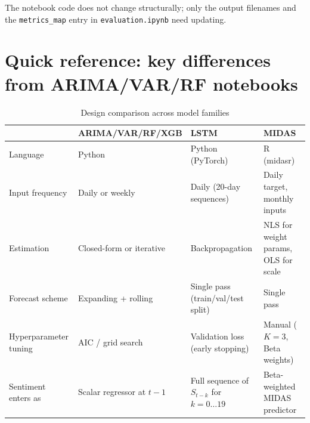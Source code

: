 \documentclass[12pt, a4paper]{article}
\begin{document}
The notebook code does not change structurally; only the output filenames and the
\texttt{metrics\_map} entry in \texttt{evaluation.ipynb} need updating.

\section{Quick reference: key differences from ARIMA/VAR/RF notebooks}

\begin{table}[H]
\centering
\caption{Design comparison across model families}
\begin{tabular}{p{3cm}p{3cm}p{3cm}p{3cm}}
\toprule
 & ARIMA/VAR/RF/XGB & LSTM & MIDAS \\
\midrule
Language & Python & Python (PyTorch) & R (midasr) \\
Input frequency & Daily or weekly & Daily (20-day sequences) & Daily target, monthly inputs \\
Estimation & Closed-form or iterative & Backpropagation & NLS for weight params, OLS for scale \\
Forecast scheme & Expanding + rolling & Single pass (train/val/test split) & Single pass \\
Hyperparameter tuning & AIC / grid search & Validation loss (early stopping) & Manual ($K = 3$, Beta weights) \\
Sentiment enters as & Scalar regressor at $t-1$ & Full sequence of $S_{t-k}$ for $k = 0 \ldots 19$ & Beta-weighted MIDAS predictor \\
\bottomrule
\end{tabular}
\end{table}
\end{document}

